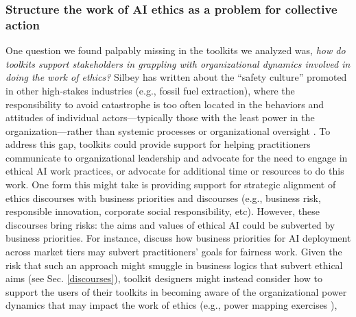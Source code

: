 \documentclass[acmsmall]{acmart}
\begin{document}
\subsubsection{Structure the work of AI ethics as a problem for collective action}
One question we found palpably missing in the toolkits we analyzed was, \textit{how do toolkits support stakeholders in grappling with organizational dynamics involved in doing the work of ethics?} Silbey has written about the ``safety culture'' promoted in other high-stakes industries (e.g., fossil fuel extraction), where the responsibility to avoid catastrophe is too often located in the behaviors and attitudes of individual actors---typically those with the least power in the organization---rather than systemic processes or organizational oversight \cite{silbey2009taming}. To address this gap, toolkits could provide support for helping practitioners communicate to organizational leadership and advocate for the need to engage in ethical AI work practices, or advocate for additional time or resources to do this work. One form this might take is providing support for strategic alignment of ethics discourses with business priorities and discourses (e.g., business risk, responsible innovation, corporate social responsibility, etc). However, these discourses bring risks: the aims and values of ethical AI could be subverted by business priorities. For instance, \citet{madaio2022assessing} discuss how business priorities for AI deployment across market tiers may subvert practitioners' goals for fairness work.
Given the risk that such an approach might smuggle in business logics that subvert ethical aims (see Sec. \ref{discourses}), toolkit designers might instead consider how to support the users of their toolkits in becoming aware of the organizational power dynamics that may impact the work of ethics (e.g., power mapping exercises \cite{LittleSis2017MapThePower}), 
\end{document}
